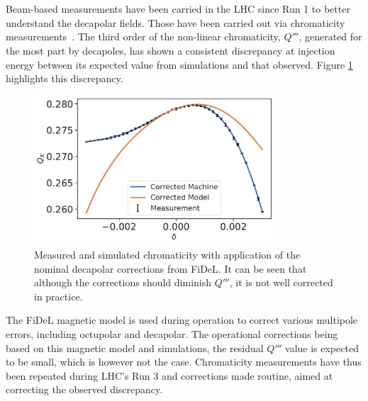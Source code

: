 \section{}


\subsection{}

Beam-based measurements have been carried in the LHC since Run 1 to better understand the decapolar
fields. Those have been carried out via chromaticity
measurements~\cite{maclean_non-linear_2011,maclean_commissioning_2016,maclean_measurement_2014}. 
The third order of the non-linear chromaticity, $Q'''$, generated for the most part by decapoles,
has shown a consistent discrepancy at injection energy between its expected value from simulations
and that observed. Figure \ref{fig:decapoles:bare_chroma_vs_simulations} highlights this
discrepancy.

\begin{figure}[!htb]
    \centering
    \includegraphics[width=0.8\textwidth]{images/dq3_corrected_simulation_fidel.pdf}
    \caption{Measured and simulated chromaticity with application of the nominal decapolar
    corrections from FiDeL. It can be seen that although the corrections should diminish $Q'''$, it
    is not well corrected in practice.}
    \label{fig:decapoles:bare_chroma_vs_simulations}
\end{figure}

The FiDeL magnetic model is used during operation to correct various multipole errors, including
octupolar and decapolar. The operational corrections being based on this magnetic model and
simulations, the residual $Q'''$ value is expected to be small, which is however not the case.
Chromaticity measurements have thus been repeated during LHC's Run 3 and corrections made routine,
aimed at correcting the observed discrepancy.

